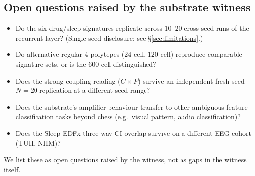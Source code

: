 \subsection{Open questions raised by the substrate witness}

\begin{itemize}\itemsep=2pt
\item Do the six drug/sleep signatures replicate across $10$--$20$
  cross-seed runs of the recurrent layer? (Single-seed disclosure;
  see \S\ref{sec:limitations}.)
\item Do alternative regular 4-polytopes ($24$-cell, $120$-cell)
  reproduce comparable signature sets, or is the $600$-cell
  distinguished?
\item Does the strong-coupling reading ($C\!\times\!P$) survive an
  independent fresh-seed $N\!=\!20$ replication at a different seed
  range?
\item Does the substrate's amplifier behaviour transfer to other
  ambiguous-feature classification tasks beyond chess (e.g.\ visual
  pattern, audio classification)?
\item Does the Sleep-EDFx three-way CI overlap survive on a different
  EEG cohort (TUH, NHM)?
\end{itemize}
We list these as open questions raised by the witness, not as gaps
in the witness itself.
